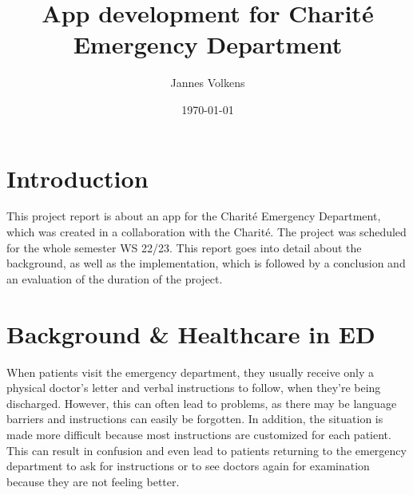 \documentclass[]{report}
\title{App development for Charité Emergency Department}
\author{Jannes Volkens}
\date{\today}
\begin{document}
\maketitle

\section{Introduction}
This project report is about an app for the Charité Emergency Department, which was created in a collaboration with the Charité. The project was scheduled for the whole semester WS 22/23. This report goes into detail about the background, as well as the implementation, which is followed by a conclusion and an evaluation of the duration of the project.

\section{Background \& Healthcare in ED}
When patients visit the emergency department, they usually receive only a physical doctor's letter and verbal instructions to follow, when they're being discharged. However, this can often lead to problems, as there may be language barriers and instructions can easily be forgotten. In addition, the situation is made more difficult because most instructions are customized for each patient. This can result in confusion and even lead to patients returning to the emergency department to ask for instructions or to see doctors again for examination because they are not feeling better.
\end{document}

